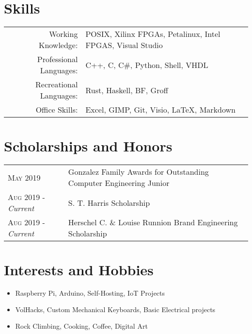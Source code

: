 \documentclass[a4paper,11pt]{article}
\begin{document}
\section{Skills}
\begin{tabularx}{\textwidth}{rl}
   Working Knowledge: & POSIX, Xilinx FPGAs, Petalinux, Intel FPGAS, Visual Studio\\
   Professional Languages: & C++, C, C\#, Python, Shell, VHDL\\
   Recreational Languages: & Rust, Haskell, BF, Groff\\
   Office Skills: & Excel, GIMP, Git, Visio, \LaTeX{}, Markdown\\
\end{tabularx}

\section{Scholarships and Honors}
\begin{tabularx}{\textwidth}{lX}
   \textsc{May 2019} & Gonzalez Family Awards for Outstanding Computer Engineering Junior\\
   \textsc{Aug 2019} \-- \emph{Current} & S. T. Harris Scholarship\\
   \textsc{Aug 2019} \-- \emph{Current} & Herschel C. \& Louise Runnion Brand Engineering Scholarship\\
\end{tabularx}

\section{Interests and Hobbies}
\begin{itemize}[topsep=1pt,itemsep=0pt,partopsep=1pt, parsep=1pt]
   \item Raspberry Pi, Arduino, Self-Hosting, IoT Projects
   \item VolHacks, Custom Mechanical Keyboards, Basic Electrical projects
   \item Rock Climbing, Cooking, Coffee, Digital Art
\end{itemize}
\end{document}
